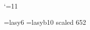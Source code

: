 {\newcommand{\mnistblock}[2]{
\vspace*{-0.5em}

#1

\vspace*{-0.75em}

\texttt{[image: \#2]}
}


\usepackage{ulem}

\relax
\catcode`\@=11 %

\font\uwavefontold=lasy6
\font\uwavefont=lasyb10 scaled 652

\def\uwave{%
  \bgroup
    \markoverwith{%
      \lower4.5\p@\hbox{\color{darkred}\uwavefont\char58}%
    }%
  \ULon
}








}
